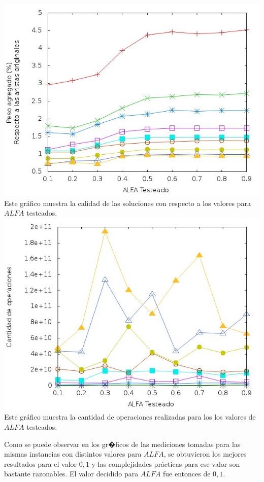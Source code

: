 \documentclass[11pt, a4paper, spanish]{article}
\begin{document}
\begin{center}
\centering \includegraphics[scale=0.40]{img/VariacionAlfa.jpg}\\
\small{Este gr\'afico muestra la calidad de las soluciones con respecto a los valores para $ALFA$ testeados.}
\centering \includegraphics[scale=0.40]{img/VariacionAlfaComplejidad.jpg}\\
\small{Este gr\'afico muestra la cantidad de operaciones realizadas para los los valores de $ALFA$ testeados.}
\end{center}
Como se puede observar en los gr�ficos de las mediciones tomadas para las mismas instancias con distintos valores para $ALFA$, se obtuvieron los mejores resultados para el valor $0,1$ y las complejidades pr\'acticas para ese valor son bastante razonables. El valor decidido para $ALFA$ fue entonces de $0,1$.\\
\end{document}
